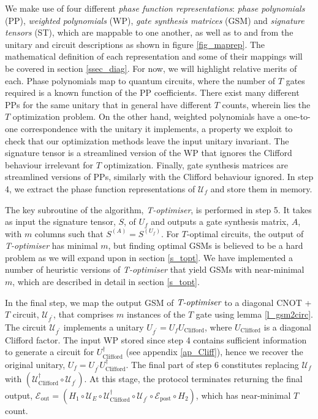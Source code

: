 \documentclass[notitlepage]{article}
\theoremstyle{definition}
\theoremstyle{problem}
\theoremstyle{lemma}
\begin{document}
We make use of four different \emph{phase function representations}: \emph{phase polynomials} (PP), \emph{weighted polynomials} (WP), \emph{gate synthesis matrices} (GSM) and \emph{signature tensors} (ST), which are mappable to one another, as well as to and from the unitary and circuit descriptions as shown in figure \ref{fig_maprep}. The mathematical definition of each representation and some of their mappings will be covered in section \ref{ssec_diag}. For now, we will highlight relative merits of each.
Phase polynomials map to quantum circuits, where the number of $T$ gates required is a known function of the PP coefficients.
There exist many different PPs for the same unitary that in general have different $T$ counts, wherein lies the $T$ optimization problem. On the other hand, weighted polynomials have a one-to-one correspondence with the unitary it implements, a property we exploit to check that our optimization methods leave the input unitary invariant. The signature tensor is a streamlined version of the WP that ignores the Clifford behaviour irrelevant for $T$ optimization. Finally, gate synthesis matrices are streamlined versions of PPs, similarly with the Clifford behaviour ignored. In step 4, we extract the phase function representations of $\mathcal{U}_f$ and store them in memory.



The key subroutine of the algorithm, \emph{T-optimiser}, is performed in step 5. It takes as input the signature tensor, $S$, of $U_f$ and outputs a gate synthesis matrix, $A$, with $m$ columns such that $S^{(A)} = S^{(U_f)}$. For $T$-optimal circuits, the output of \emph{T-optimiser} has minimal $m$, but finding optimal GSMs is believed to be a hard problem as we will expand upon in section \ref{s_topt}. We have implemented a number of heuristic versions of \emph{T-optimiser} that yield GSMs with near-minimal $m$, which are described in detail in section \ref{s_topt}.



In the final step, we map the output GSM of $\emph{T-optimiser}$ to a diagonal CNOT + $T$ circuit, $\mathcal{U}_{f^\prime}$, that comprises $m$ instances of the $T$ gate using lemma \ref{l_gsm2circ}. The circuit $\mathcal{U}_{f^\prime}$ implements a unitary $U_{f^\prime}=U_fU_{\text{Clifford}}$, where $U_{\text{Clifford}}$ is a diagonal Clifford factor. The input WP stored since step 4 contains sufficient information to generate a circuit for $U_{\text{Clifford}}^\dagger$ (see appendix \ref{ap_Cliff}), hence we recover the original unitary, $U_f=U_{f^\prime} U_{\text{Clifford}}^\dagger$. The final part of step 6 constitutes replacing $\mathcal{U}_f$ with $(\mathcal{U}^\dagger_{\text{Clifford}}\circ\mathcal{U}_{f^\prime})$. At this stage, the protocol terminates returning the final output, $\mathcal{E}_{\text{out}} = (H_1\circ \mathcal{U}_E \circ \mathcal{U}^\dagger_{\text{Clifford}}\circ\mathcal{U}_{f^\prime} \circ \mathcal{E}_{\text{post}}\circ H_2)$, which has near-minimal $T$ count.
\end{document}
